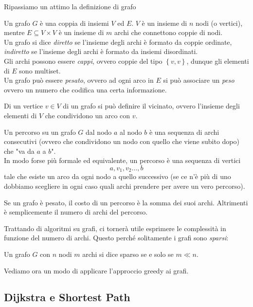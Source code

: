 \documentclass[11pt]{scrartcl}
\begin{document}
	Ripassiamo un attimo la definizione di grafo
	\begin{definition}
		Un grafo $G$ è una coppia di insiemi $V$ ed $E$. $V$ è un insieme di $n$ nodi (o vertici), mentre $E\subseteq V\times V$ è un insieme di $m$ archi che connettono coppie di nodi. \\
		Un grafo si dice \textit{diretto} se l'insieme degli archi è formato da coppie ordinate, \textit{indiretto} se l'insieme degli archi è formato da insiemi disordinati. \\
		Gli archi possono essere \textit{cappi}, ovvero coppie del tipo $\left\{v,v\right\}$, dunque gli elementi di $E$ sono multiset. \\
		Un grafo può essere \textit{pesato}, ovvero ad ogni arco in $E$ si può associare un \textit{peso} ovvero un numero che codifica una certa informazione.
	\end{definition}
	\begin{definition}[Vicinati]
		Di un vertice $v\in V$ di un grafo si può definire il vicinato, ovvero l'insieme degli elementi di $V$ che condividono un arco con $v$. 
	\end{definition}
	\begin{definition}[Percorso]
		Un percorso su un grafo $G$ dal nodo $a$ al nodo $b$ è una sequenza di archi consecutivi (ovvero che condividono un nodo con quello che viene subito dopo) che "va da $a$ a $b$". \\
		In modo forse più formale ed equivalente, un percorso è una sequenza di vertici 
		$$a,v_1,v_2\dots,b$$
		tale che esiste un arco da ogni nodo a quello successivo (se ce n'è più di uno dobbiamo scegliere in ogni caso quali archi prendere per avere un vero percorso).
	\end{definition}
	\begin{definition}
		Se un grafo è pesato, il costo di un percorso è la somma dei suoi archi. Altrimenti è semplicemente il numero di archi del percorso.
	\end{definition}
	Trattando di algoritmi su grafi, ci tornerà utile esprimere le complessità in funzione del numero di archi. Questo perché solitamente i grafi sono \textit{sparsi}:
	\begin{definition}
		Un grafo $G$ con $n$ nodi $m$ archi si dice sparso se e solo se $m\ll n$.
	\end{definition}
	Vediamo ora un modo di applicare l'approccio greedy ai grafi.
	
	\subsection{Dijkstra e Shortest Path}
	
\end{document}
